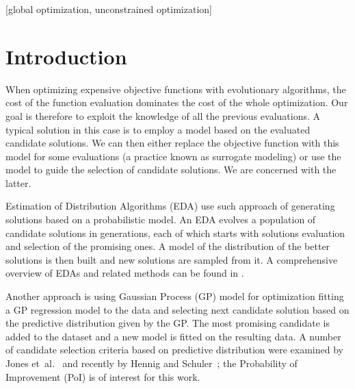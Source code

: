 \documentclass{sig-alternate}
\begin{document}
\maketitle
\begin{abstract}
Model Guided Sampling Optimization (MGSO) is a novel expensive black-box
optimization method based on a combination of ideas from Estimation of 
Distribution Algorithms and global optimization methods using Gaussian 
Processes. The algorithm is described and its implementation tested on 
three benchmark functions as a proof of concept.
\end{abstract}

[global optimization,
unconstrained optimization]


\section{Introduction}

When optimizing expensive objective functions with evolutionary algorithms, the cost of the function 
evaluation dominates the cost of the whole optimization. Our goal is therefore to exploit the knowledge 
of all the previous evaluations. A typical solution in this case is to employ a model based on the evaluated 
candidate solutions. We can then either replace the objective function  with this model for some 
evaluations (a practice known as surrogate modeling) or use the model to guide the selection of candidate 
solutions. We are concerned with the latter.

Estimation of Distribution Algorithms (EDA) use such approach of generating solutions based on a probabilistic model. An EDA evolves a population of 
candidate solutions in generations, each of which starts with solutions evaluation and selection of the
promising ones. A model of the distribution of the better solutions is then built and new 
solutions are sampled from it. A comprehensive overview of EDAs and related methods can be found in \cite{pelikan2006scalable}.

Another approach is using Gaussian Process (GP) model for optimization fitting a GP regression model to the 
data and selecting next candidate solution based on the predictive distribution given by the GP. The most 
promising candidate is added to the dataset and a new model is fitted on the resulting data. A number of candidate 
selection criteria based on predictive distribution were examined by Jones et~al.~\cite{jones01taxonomy} 
and recently by Hennig and Schuler~\cite{hennig12entropy}; the Probability of Improvement (PoI) is of interest for this work.
\end{document}
